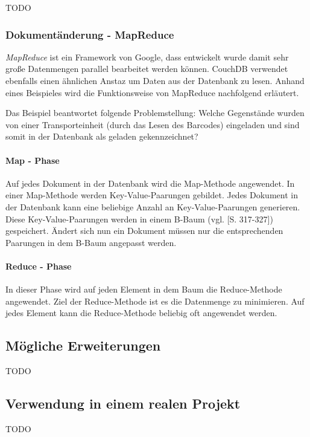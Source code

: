 TODO

\subsubsection{Dokumentänderung - MapReduce}

\emph{MapReduce} ist ein Framework von Google, dass entwickelt wurde damit sehr große
	Datenmengen parallel bearbeitet werden können. CouchDB verwendet ebenfalls
	einen ähnlichen Anstaz um Daten aus der Datenbank zu lesen. Anhand eines
	Beispieles wird die Funktionsweise von MapReduce nachfolgend erläutert.

Das Beispiel beantwortet folgende Problemstellung: Welche Gegenstände wurden
	von einer Transporteinheit (durch das Lesen des Barcodes) eingeladen
	und sind somit in der Datenbank als geladen gekennzeichnet?

\paragraph{Map - Phase} Auf jedes Dokument in der Datenbank wird die Map-Methode
	angewendet. In einer Map-Methode werden Key-Value-Paarungen gebildet. Jedes
	Dokument in der Datenbank kann eine beliebige Anzahl an Key-Value-Paarungen
	generieren. Diese Key-Value-Paarungen werden in einem B-Baum (vgl.
	\cite{Ottmann96}[S. 317-327]) gespeichert. Ändert sich nun ein Dokument müssen
	nur die entsprechenden Paarungen in	dem B-Baum angepasst werden. 

\paragraph{Reduce - Phase} In dieser Phase wird auf jeden Element in dem Baum die
	Reduce-Methode angewendet. Ziel der Reduce-Methode ist es die Datenmenge zu
	minimieren. Auf jedes Element kann die Reduce-Methode beliebig oft angewendet
	werden.

\subsection{Mögliche Erweiterungen}

TODO

\subsection{Verwendung in einem realen Projekt}

TODO